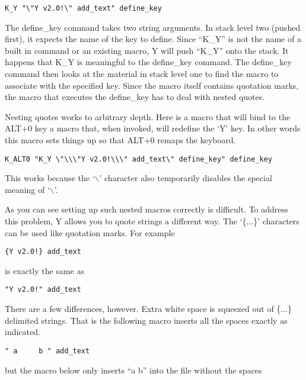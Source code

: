 \begin{verbatim}
K_Y "\"Y v2.0!\" add_text" define_key
\end{verbatim}

The define\_key command takes two string arguments. In stack level two (pushed first), it
expects the name of the key to define. Since ``K\_Y'' is not the name of a built in command or
an existing macro, Y will push ``K\_Y'' onto the stack. It happens that K\_Y is meaningful to
the define\_key command. The define\_key command then looks at the material in stack level one
to find the macro to associate with the specified key. Since the macro itself contains quotation
marks, the macro that executes the define\_key has to deal with nested quotes.

Nesting quotes works to arbitrary depth. Here is a macro that will bind to the ALT+0 key a macro
that, when invoked, will redefine the `Y' key. In other words this macro sets things up so that
ALT+0 remaps the keyboard.

\begin{verbatim}
K_ALT0 "K_Y \"\\\"Y v2.0!\\\" add_text\" define_key" define_key
\end{verbatim}

This works because the `$\backslash$' character also temporarily disables the special meaning of
`$\backslash$'.

As you can see setting up such nested macros correctly is difficult. To address this problem, Y
allows you to quote strings a different way. The `\{$\ldots$\}' characters can be used like
quotation marks. For example

\begin{verbatim}
{Y v2.0!} add_text
\end{verbatim}

is exactly the same as

\begin{verbatim}
"Y v2.0!" add_text
\end{verbatim}

There are a few differences, however. Extra white space is squeezed out of \{$\ldots$\}
delimited strings. That is the following macro inserts all the spaces exactly as indicated.

\begin{verbatim}
" a     b " add_text
\end{verbatim}

but the macro below only inserts ``a b'' into the file without the spaces

